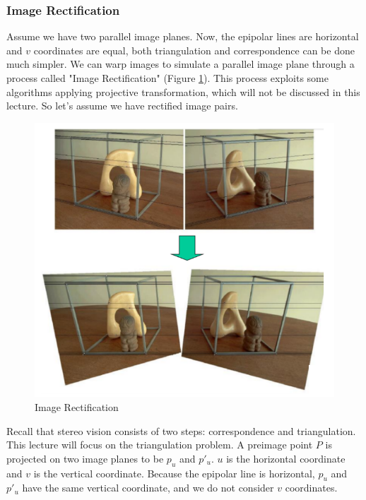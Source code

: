 \documentclass[twoside]{article}
\begin{document}
\subsubsection{Image Rectification}

Assume we have two parallel image planes. Now, the epipolar lines are horizontal and $v$ coordinates are equal, both triangulation and correspondence can be done much simpler. We can warp images to simulate a parallel image plane through a process called "Image Rectification" (Figure \ref{rect}). This process exploits some algorithms applying projective transformation, which will not be discussed in this lecture. So let's assume we have rectified image pairs.

\begin{figure}[h!]
  \begin{center}
	\includegraphics[scale=0.5]{rectified_image.PNG}  \end{center}
  \caption{Image Rectification}
  \label{rect}
\end{figure}

Recall that stereo vision consists of two steps: correspondence and triangulation. This lecture will focus on the triangulation problem. A preimage point $P$ is projected on two image planes to be $p_u$ and $p'_u$. $u$ is the horizontal coordinate and $v$ is the vertical coordinate. Because the epipolar line is horizontal, $p_u$ and $p'_u$ have the same vertical coordinate, and we do not consider $v$ coordinates.
\end{document}
